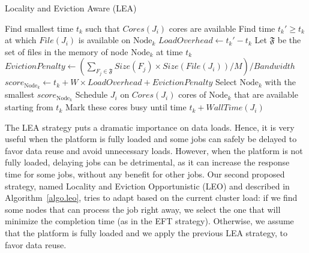 \documentclass[sigconf,review,anonymous]{acmart}
\newcommand{\Node}[1]{\ensuremath{\mathrm{Node}_{#1}}\xspace}
\newcommand{\file}{\ensuremath{\mathit{File}}\xspace}
\newcommand{\size}{\ensuremath{\mathit{Size}}\xspace}
\newcommand{\memory}{\ensuremath{\mathit{M}}\xspace}
\newcommand{\bandwidth}{\mathit{Bandwidth}\xspace}
\newcommand{\core}{\mathit{Cores}\xspace}
\newcommand{\walltime}{\mathit{WallTime}\xspace}
\newcommand{\filesubset}{\ensuremath{\mathfrak{F}}\xspace}
\newcommand{\nodeset}{\ensuremath{\mathbb{N}}\xspace}
\begin{document}
\begin{algorithm}[t]%
\caption{Locality and Eviction Aware (LEA)}\label{algo.lea}
\begin{algorithmic}[1]
		\ForEach{$\Node{k} \in \nodeset$}
			\State Find smallest time $t_k$ such that $\core(J_i)$ cores are available
			\State Find time $t_k'\geq t_k$ at which $\file(J_i)$ is available on $\Node{k}$
			\State $\mathit{LoadOverhead} \gets t_k' - t_k$ %
                        \State Let $\filesubset$ be the set of files in the memory of node \Node{k} at time $t_k$
			\State $\mathit{EvictionPenalty} \gets
			(\sum_{F_j\in\filesubset}\size(F_j) \times \size(\file(J_i))/\memory)/\bandwidth$
			\State $score_{\Node{k}} \gets t_k + W \times \mathit{LoadOverhead} + \mathit{EvictionPenalty}$
		\EndFor
                \State Select \Node{k} with the smallest $score_{\Node{k}}$
                \State Schedule $J_i$ on $\core(J_i)$ cores of \Node{k} that are available starting from $t_k$
                \State Mark these cores busy until time $t_k +\walltime(J_i)$
	\EndFor
\end{algorithmic}
\end{algorithm}


The LEA strategy puts a dramatic importance on data loads. Hence, it
is very useful when the platform is fully loaded and  some jobs
can safely be delayed to favor data reuse and avoid
unnecessary loads. However, when the platform is not fully loaded,
delaying jobs can be detrimental, as it can increase the response
time for some jobs, without any benefit for other jobs. Our second proposed strategy,
named Locality and Eviction Opportunistic (LEO) and described in Algorithm~\ref{algo.leo}, tries to adapt based
on the current cluster load: if we find some nodes that can process the job
right away, we select the one that will minimize the completion time
(as in the EFT strategy). Otherwise, we assume that the platform is
fully loaded and we apply the previous LEA strategy, to favor data reuse.
\end{document}
